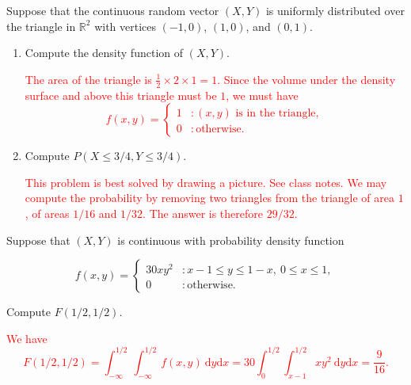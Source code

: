 \documentclass[12pt,reqno]{amsart}
\begin{document}
\bigskip
\prob Suppose that the continuous random vector $(X,Y)$ is uniformly distributed over the triangle in $\mathbb{R}^2$ with vertices $(-1,0)$, $(1,0)$, and $(0,1)$.

\medskip
\begin{enumerate}
    \item Compute the density function of $(X,Y)$.
    
    \bigskip
    \textcolor{red}{The area of the triangle is $\frac{1}{2} \times 2 \times 1 = 1$. Since the volume under the density surface and above this triangle must be $1$, we must have
        \[f(x,y) = \begin{cases}
            1 & : (x,y) \text{ is in the triangle}, \\
            0 & : \text{otherwise}.
        \end{cases}\]}
    \bigskip

    \item Compute $P(X \leq 3/4, Y \leq 3/4)$.
    
    \bigskip
    \textcolor{red}{This problem is best solved by drawing a picture. See class notes. We may compute the probability by removing two triangles from the triangle of area $1$, of areas $1/16$ and $1/32$. The answer is therefore $29/32$.}
\end{enumerate}

















\bigskip
\prob Suppose that $(X,Y)$ is continuous with probability density function

    \[f(x,y) = \begin{cases}
        30xy^2 & : x-1 \leq y \leq 1-x, \ 0 \leq x \leq 1, \\
        0 & : \text{otherwise}.
    \end{cases}\]

Compute $F(1/2,1/2)$.

\bigskip
\textcolor{red}{We have
    \[F(1/2,1/2) = \int_{-\infty}^{1/2} \int_{-\infty}^{1/2} f(x,y) \ \text{d}y \text{d}x = 30\int_{0}^{1/2} \int_{x-1}^{1/2} xy^2 \ \text{d}y\text{d}x = \frac{9}{16}.  \]}
\end{document}
